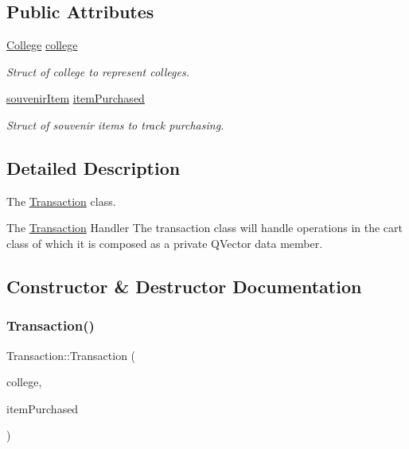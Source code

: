 \subsection*{Public Attributes}
\begin{DoxyCompactItemize}
\item 
\mbox{\label{class_transaction_a8789961780bef7d71a64eb894fb57d84}} 
\mbox{\hyperlink{struct_college}{College}} \mbox{\hyperlink{class_transaction_a8789961780bef7d71a64eb894fb57d84}{college}}
\begin{DoxyCompactList}\small\item\em Struct of college to represent colleges. \end{DoxyCompactList}\item 
\mbox{\label{class_transaction_a2526fe971714943e90457cc9bce61b56}} 
\mbox{\hyperlink{structsouvenir_item}{souvenir\+Item}} \mbox{\hyperlink{class_transaction_a2526fe971714943e90457cc9bce61b56}{item\+Purchased}}
\begin{DoxyCompactList}\small\item\em Struct of souvenir items to track purchasing. \end{DoxyCompactList}\end{DoxyCompactItemize}


\subsection{Detailed Description}
The \mbox{\hyperlink{class_transaction}{Transaction}} class. 

The \mbox{\hyperlink{class_transaction}{Transaction}} Handler The transaction class will handle operations in the cart class of which it is composed as a private Q\+Vector data member. 

\subsection{Constructor \& Destructor Documentation}
\mbox{\label{class_transaction_a027ee3210228e05081452160100a65df}} 
\subsubsection{\texorpdfstring{Transaction()}{Transaction()}}
{\footnotesize\ttfamily Transaction\+::\+Transaction (\begin{DoxyParamCaption}\item[{\mbox{\hyperlink{struct_college}{College}}}]{college,  }\item[{\mbox{\hyperlink{structsouvenir_item}{souvenir\+Item}}}]{item\+Purchased }\end{DoxyParamCaption})}



